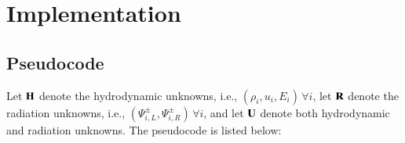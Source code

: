 \section{Implementation}
\subsection{Pseudocode}
Let $\mathbf{H}$ denote the hydrodynamic unknowns, i.e., $(\rho_i,u_i,E_i)\,\forall i$,
let $\mathbf{R}$ denote the radiation unknowns, i.e., $(\Psi_{i,L}^\pm,\Psi_{i,R}^\pm)
\,\forall i$, and let $\mathbf{U}$ denote both hydrodynamic and radiation
unknowns. The pseudocode is listed below:

